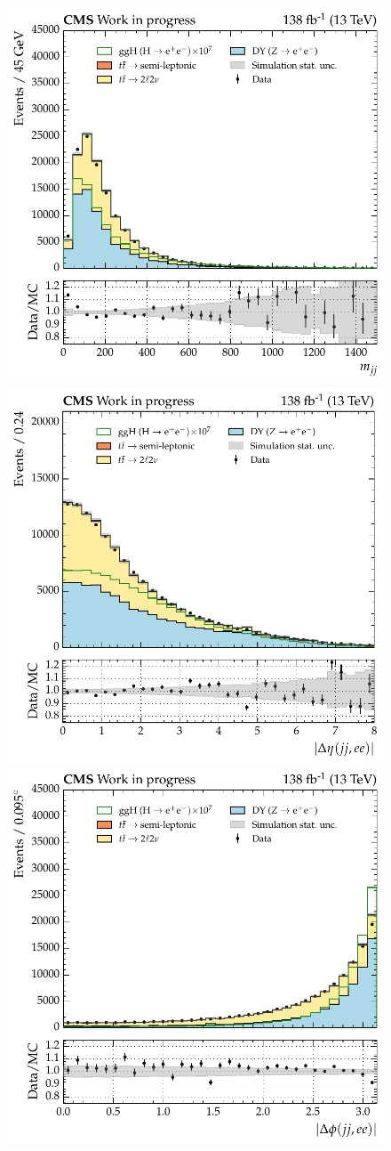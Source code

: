 \begin{figure}[htbp!]
\centering
\includegraphics[width =0.33\linewidth]{Figures/Hee/ggH/dataMC/all_inputs/ggH_BDT_pt_reweighted_dijetMass.pdf}\hfill%
\includegraphics[width =0.33\linewidth]{Figures/Hee/ggH/dataMC/all_inputs/ggH_BDT_pt_reweighted_dijetDieleAbsDEta.pdf}\hfill%
\includegraphics[width =0.33\linewidth]{Figures/Hee/ggH/dataMC/all_inputs/ggH_BDT_pt_reweighted_dijetDieleAbsDPhiTrunc.pdf}\hfill%
 

\end{figure}
